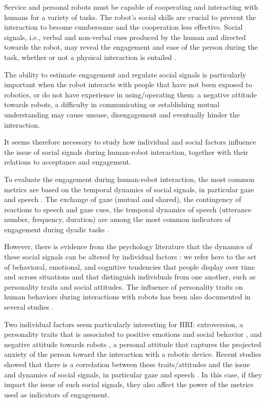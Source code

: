 \documentclass[twocolumn]{svjour3}          %
\begin{document}
Service and personal robots must be capable of cooperating and interacting with humans for a variety of tasks.
The robot's social skills are crucial to prevent the interaction to become cumbersome and the cooperation less effective.  
Social signals, i.e., verbal and non-verbal cues produced by the human and directed towards the robot, may reveal the engagement and ease of the person during the task, whether or not a physical interaction is entailed \cite{Anzalone2015engagement,ivaldi2014frontiers,Chen2014NARStouch}.

The ability to estimate engagement and regulate social signals is particularly important when the robot interacts with people that have not been exposed to robotics, or do not have experience in using/operating them: a negative attitude towards robots, a difficulty in communicating or establishing mutual understanding may cause unease, disengagement and eventually hinder the interaction.

It seems therefore necessary to study how individual and social factors influence the issue of social signals during human-robot interaction, together with their relations to acceptance and engagement.


To evaluate the engagement during human-robot interaction, the most common metrics are based on the temporal dynamics of social signals, in particular gaze and speech \cite{Anzalone2015engagement,rich2010recognizing}.
The exchange of gaze (mutual and shared), the contingency of reactions to speech and gaze cues, the temporal dynamics of speech (utterance number, frequency, duration) are among the most common indicators of engagement during dyadic tasks \cite{ivaldi2014frontiers}.


However, there is evidence from the psychology literature that the dynamics of these social signals can be altered by individual factors \cite{LaFrance2004,Iizuka1992,Scherer1981}: we refer here to the set of behavioral, emotional, and cognitive tendencies that people display over time and across situations and that distinguish individuals from one another, such as personality traits and social attitudes.
The influence of personality traits on human behaviors during interactions with robots has been also documented in several studies \cite{Takayama2009proxemics,Dang2014personality,Aly2013personality}. 

Two individual factors seem particularly interesting for HRI: extroversion, a personality traits that is associated to positive emotions and social behavior \cite{BIGFIVE}, and negative attitude towards robots \cite{NARS2006}, a personal attitude that captures the projected anxiety of the person toward the interaction with a robotic device. 
Recent studies showed that there is a correlation between these traits/attitudes and the issue and dynamics of social signals, in particular gaze and speech \cite{Nomura2008}.
In this case, if they impact the issue of such social signals, they also affect the power of the metrics used as indicators of engagement.
\end{document}

